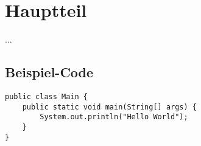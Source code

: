\section{Hauptteil}

...

\subsection{Beispiel-Code}

\begin{lstlisting}
public class Main {
    public static void main(String[] args) {
        System.out.println("Hello World");
    }
}
\end{lstlisting}
